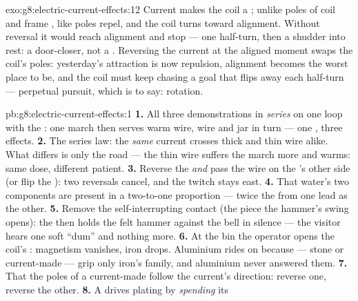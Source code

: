 \begin{solution}{exo:g8:electric-current-effects:12}
Current makes the coil a ; unlike poles of coil and frame
, like poles repel, and the coil turns toward alignment.
Without reversal it would reach alignment and stop --- one
half-turn, then a shudder into rest: a door-closer, not a .
Reversing the current at the aligned moment swaps the coil's
poles: yesterday's attraction is now repulsion, alignment
becomes the worst place to be, and the coil must keep chasing a
goal that flips away each half-turn --- perpetual pursuit,
which is to say: rotation.
\end{solution}

\begin{solution}{pb:g8:electric-current-effects:1}
\textbf{1.} All three demonstrations in \emph{series} on one
loop with the : one march then serves warm wire, 
wire and jar in turn --- one , three effects.
\textbf{2.} The series law: the \emph{same} current crosses
thick and thin wire alike. What differs is only the road --- the
thin wire suffers the march more and warms: same dose, different
patient.
\textbf{3.} Reverse the  \emph{and} pass the wire on the
's other side (or flip the ): two reversals cancel,
and the twitch stays east.
\textbf{4.} That water's two components are present in a
two-to-one proportion --- twice the  from one lead as the
other.
\textbf{5.} Remove the self-interrupting contact (the piece the
hammer's swing opens): the  then holds the felt
hammer against the bell in silence --- the visitor hears one
soft ``dum'' and nothing more.
\textbf{6.} At the bin the operator opens the coil's :
magnetism vanishes, iron drops. Aluminium rides on because
 --- stone or current-made --- grip only iron's family,
and aluminium never answered them.
\textbf{7.} That the poles of a current-made  follow the
current's direction: reverse one, reverse the other.
\textbf{8.} A  drives plating by \emph{spending} its

\end{solution}
